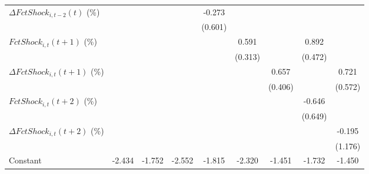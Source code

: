 {\begin{tabular}{l*{8}{c}}
\addlinespace
$ \Delta FctShock_{i,t-2}(t)$ (\%)&                     &                     &                     &      -0.273         &                     &                     &                     &                     \\
                    &                     &                     &                     &     (0.601)         &                     &                     &                     &                     \\
\addlinespace
$ FctShock_{i,t}(t+1)$ (\%)&                     &                     &                     &                     &       0.591\sym{*}  &                     &       0.892\sym{*}  &                     \\
                    &                     &                     &                     &                     &     (0.313)         &                     &     (0.472)         &                     \\
\addlinespace
$ \Delta FctShock_{i,t}(t+1)$ (\%)&                     &                     &                     &                     &                     &       0.657         &                     &       0.721         \\
                    &                     &                     &                     &                     &                     &     (0.406)         &                     &     (0.572)         \\
\addlinespace
$ FctShock_{i,t}(t+2)$ (\%)&                     &                     &                     &                     &                     &                     &      -0.646         &                     \\
                    &                     &                     &                     &                     &                     &                     &     (0.649)         &                     \\
\addlinespace
$ \Delta FctShock_{i,t}(t+2)$ (\%)&                     &                     &                     &                     &                     &                     &                     &      -0.195         \\
                    &                     &                     &                     &                     &                     &                     &                     &     (1.176)         \\
\addlinespace
Constant            &      -2.434\sym{***}&      -1.752\sym{***}&      -2.552\sym{***}&      -1.815\sym{***}&      -2.320\sym{***}&      -1.451\sym{***}&      -1.732\sym{***}&      -1.450\sym{***}\\

\end{tabular}}
